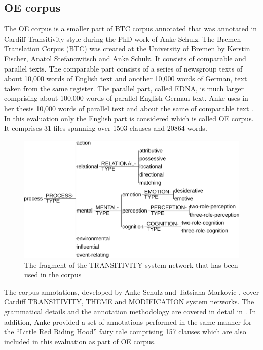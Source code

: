 \subsection{OE corpus}

    The OE corpus is a smaller part of BTC corpus annotated that was annotated in Cardiff Transitivity style during the PhD work of Anke Schulz. The Bremen Translation Corpus (BTC) was created at the University of Bremen by Kerstin Fischer, Anatol Stefanowitsch and Anke Schulz. It consists of comparable and parallel texts. The comparable part consists of a series of newsgroup texts of about 10,000 words of English text and another 10,000 words of German, text taken from the same register. The parallel part, called EDNA, is much larger comprising about 100,000 words of parallel English-German text. Anke uses in her thesis 10,000 words of parallel text and about the same of comparable text \citep[31]{schulz2015me}. In this evaluation only the English part is considered which is called OE corpus. It comprises 31 files spanning over 1503 clauses and 20864 words. 
    
    \begin{figure}[!h]
        \centering
        \includegraphics[width=.75\textwidth]{Figures/Evaluation/trans-simplified.pdf}
        \caption{The fragment of the TRANSITIVITY system network that has been used in the corpus}
        \label{fig:transitivity-simplified}
    \end{figure}

    The corpus annotations, developed by Anke Schulz and Tatsiana Markovic \citep[36]{schulz2015me}, cover Cardiff TRANSITIVITY, THEME and MODIFICATION system networks. The grammatical details and the annotation methodology are covered in detail in \citet[48-161]{schulz2015me}. In addition, Anke provided a set of annotations performed in the same manner for the ``Little Red Riding Hood'' fairy tale comprising 157 clauses which are also included in this evaluation as part of OE corpus.
    
